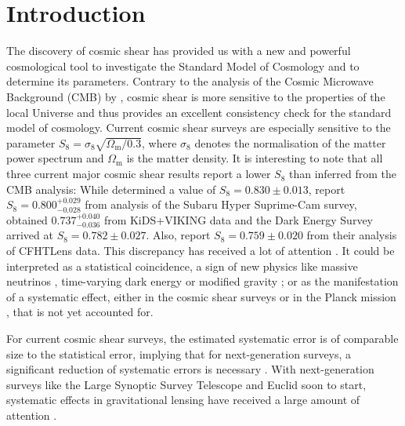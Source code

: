\documentclass[referee]{aa} %
\renewcommand{\[}{\begin{equation}}
\renewcommand{\]}{\end{equation}}
\renewcommand{\rm}{\mathrm}
\begin{document}

   \maketitle

%
\section{Introduction}
The discovery of cosmic shear has provided us with a new and powerful cosmological tool to investigate the Standard Model of Cosmology and to determine its parameters. Contrary to the analysis of the Cosmic Microwave Background (CMB) by \citet{2018arXiv180706209P}, cosmic shear is more sensitive to the properties of the local Universe and thus provides an excellent consistency check for the standard model of cosmology. Current cosmic shear surveys are especially sensitive to the parameter $S_8=\sigma_8 \sqrt{\Omega_{\rm m}/0.3}$, where $\sigma_8$ denotes the normalisation of the matter power spectrum and $\Omega_{\rm m}$ is the matter density.
It is interesting to note that all three current major cosmic shear results report a lower $S_8$ than inferred from the CMB analysis: While \citet{2018arXiv180706209P} determined a value of $S_8 = 0.830 \pm 0.013$, \citet{2018arXiv180909148H} report $S_8 = 0.800^{+0.029}_{-0.028}$ from analysis of the Subaru Hyper Suprime-Cam survey, \citet[][hereafter H18]{2018arXiv181206076H} obtained $0.737_{-0.036}^{+0.040}$ from KiDS+VIKING data and the Dark Energy Survey \citep{2018PhRvD..98d3528T} arrived at $S_8=0.782\pm 0.027$. Also, \citet{2013MNRAS.432.2433H} report $S_8 = 0.759 \pm 0.020$ from their analysis of CFHTLens data. This discrepancy has received a lot of attention \citep{2017MNRAS.471.1259J,2016MNRAS.459..971K}. It could be interpreted as a statistical coincidence, a sign of new physics like massive neutrinos \citep{2014PhRvL.112e1303B}, time-varying dark energy or modified gravity \citep{2016A&A...594A..14P}; or as the manifestation of a systematic effect, either in the cosmic shear surveys or in the Planck mission \citep{2016ApJ...818..132A}, that is not yet accounted for. 

For current cosmic shear surveys, the estimated systematic error is of comparable size to the statistical error, implying that for next-generation surveys, a significant reduction of systematic errors is necessary \citep[compare][hereafter H17]{2017MNRAS.465.1454H}. With next-generation surveys like the Large Synoptic Survey Telescope \citep{Ivezic:2008} and Euclid \citep{Laureijs:2011} soon to start, systematic effects in gravitational lensing have received a large amount of attention \citep{2018arXiv181002353A,2019arXiv190207439B,2019arXiv190109488S}. %
\end{document}
